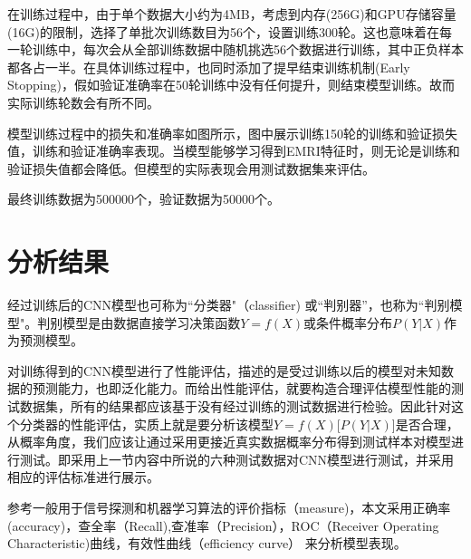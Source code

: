 在训练过程中，由于单个数据大小约为4MB，考虑到内存(256G)和GPU存储容量(16G)的限制，选择了单批次训练数目为56个，设置训练300轮。这也意味着在每一轮训练中，每次会从全部训练数据中随机挑选56个数据进行训练，其中正负样本都各占一半。在具体训练过程中，也同时添加了提早结束训练机制(Early Stopping)，假如验证准确率在50轮训练中没有任何提升，则结束模型训练。故而实际训练轮数会有所不同。

模型训练过程中的损失和准确率如图所示，图中展示训练150轮的训练和验证损失值，训练和验证准确率表现。当模型能够学习得到EMRI特征时，则无论是训练和验证损失值都会降低。但模型的实际表现会用测试数据集来评估。

最终训练数据为500000个，验证数据为50000个。

\section{分析结果}
经过训练后的CNN模型也可称为``分类器"（classifier) 或``判别器”，也称为``判别模型"。判别模型是由数据直接学习决策函数$Y=f(X)$或条件概率分布$P(Y|X)$作为预测模型\cite{li2012s1}。


对训练得到的CNN模型进行了性能评估，描述的是受过训练以后的模型对未知数据的预测能力，也即泛化能力\cite{li2012s1}\cite{li2019s2}。而给出性能评估，就要构造合理评估模型性能的测试数据集，所有的结果都应该基于没有经过训练的测试数据进行检验。因此针对这个分类器的性能评估，实质上就是要分析该模型$Y=f(X)$[$P(Y|X)$]是否合理，从概率角度，我们应该让通过采用更接近真实数据概率分布得到测试样本对模型进行测试。即采用上一节内容中所说的六种测试数据对CNN模型进行测试，并采用相应的评估标准进行展示。


参考一般用于信号探测和机器学习算法的评价指标（measure)\cite{li2012s1}，本文采用正确率(accuracy)，查全率（Recall),查准率（Precision），ROC（Receiver Operating Characteristic)曲线，有效性曲线（efficiency curve）
来分析模型表现。

